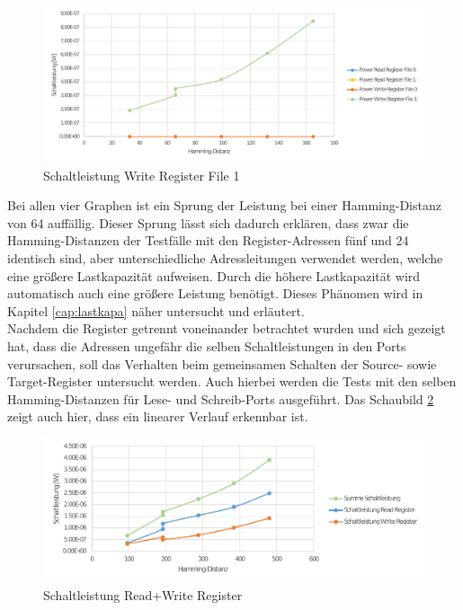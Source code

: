 \begin{figure}[H]
	\centering
	\includegraphics[width=\textwidth]{fig/register_eval_target_port1.pdf}
	\caption{Schaltleistung Write Register File 1}
	\label{fig:target1_power}
\end{figure}

Bei allen vier Graphen ist ein Sprung der Leistung bei einer Hamming-Distanz von 64 auffällig. Dieser Sprung lässt sich dadurch erklären, dass zwar die Hamming-Distanzen der Testfälle mit den Register-Adressen fünf und 24 identisch sind, aber unterschiedliche Adressleitungen verwendet werden, welche eine größere Lastkapazität aufweisen. Durch die höhere Lastkapazität wird automatisch auch eine größere Leistung benötigt. Dieses Phänomen wird in Kapitel \ref{cap:lastkapa} näher untersucht und erläutert.\\
Nachdem die Register getrennt voneinander betrachtet wurden und sich gezeigt hat, dass die Adressen ungefähr die selben Schaltleistungen in den Ports verursachen, soll das Verhalten beim gemeinsamen Schalten der Source- sowie Target-Register untersucht werden. Auch hierbei werden die Tests mit den selben Hamming-Distanzen für Lese- und Schreib-Ports ausgeführt. Das Schaubild \ref{fig:source_target_power} zeigt auch hier, dass ein linearer Verlauf erkennbar ist.

\begin{figure}[H]
	\centering
	\includegraphics[width=\textwidth]{fig/source_target_power.pdf}
	\caption{Schaltleistung Read+Write Register}
	\label{fig:source_target_power}
\end{figure}

